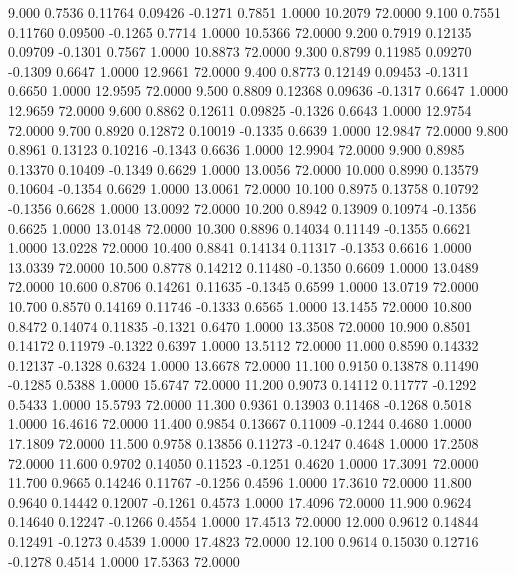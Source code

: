    9.000   0.7536   0.11764   0.09426  -0.1271   0.7851   1.0000  10.2079  72.0000
   9.100   0.7551   0.11760   0.09500  -0.1265   0.7714   1.0000  10.5366  72.0000
   9.200   0.7919   0.12135   0.09709  -0.1301   0.7567   1.0000  10.8873  72.0000
   9.300   0.8799   0.11985   0.09270  -0.1309   0.6647   1.0000  12.9661  72.0000
   9.400   0.8773   0.12149   0.09453  -0.1311   0.6650   1.0000  12.9595  72.0000
   9.500   0.8809   0.12368   0.09636  -0.1317   0.6647   1.0000  12.9659  72.0000
   9.600   0.8862   0.12611   0.09825  -0.1326   0.6643   1.0000  12.9754  72.0000
   9.700   0.8920   0.12872   0.10019  -0.1335   0.6639   1.0000  12.9847  72.0000
   9.800   0.8961   0.13123   0.10216  -0.1343   0.6636   1.0000  12.9904  72.0000
   9.900   0.8985   0.13370   0.10409  -0.1349   0.6629   1.0000  13.0056  72.0000
  10.000   0.8990   0.13579   0.10604  -0.1354   0.6629   1.0000  13.0061  72.0000
  10.100   0.8975   0.13758   0.10792  -0.1356   0.6628   1.0000  13.0092  72.0000
  10.200   0.8942   0.13909   0.10974  -0.1356   0.6625   1.0000  13.0148  72.0000
  10.300   0.8896   0.14034   0.11149  -0.1355   0.6621   1.0000  13.0228  72.0000
  10.400   0.8841   0.14134   0.11317  -0.1353   0.6616   1.0000  13.0339  72.0000
  10.500   0.8778   0.14212   0.11480  -0.1350   0.6609   1.0000  13.0489  72.0000
  10.600   0.8706   0.14261   0.11635  -0.1345   0.6599   1.0000  13.0719  72.0000
  10.700   0.8570   0.14169   0.11746  -0.1333   0.6565   1.0000  13.1455  72.0000
  10.800   0.8472   0.14074   0.11835  -0.1321   0.6470   1.0000  13.3508  72.0000
  10.900   0.8501   0.14172   0.11979  -0.1322   0.6397   1.0000  13.5112  72.0000
  11.000   0.8590   0.14332   0.12137  -0.1328   0.6324   1.0000  13.6678  72.0000
  11.100   0.9150   0.13878   0.11490  -0.1285   0.5388   1.0000  15.6747  72.0000
  11.200   0.9073   0.14112   0.11777  -0.1292   0.5433   1.0000  15.5793  72.0000
  11.300   0.9361   0.13903   0.11468  -0.1268   0.5018   1.0000  16.4616  72.0000
  11.400   0.9854   0.13667   0.11009  -0.1244   0.4680   1.0000  17.1809  72.0000
  11.500   0.9758   0.13856   0.11273  -0.1247   0.4648   1.0000  17.2508  72.0000
  11.600   0.9702   0.14050   0.11523  -0.1251   0.4620   1.0000  17.3091  72.0000
  11.700   0.9665   0.14246   0.11767  -0.1256   0.4596   1.0000  17.3610  72.0000
  11.800   0.9640   0.14442   0.12007  -0.1261   0.4573   1.0000  17.4096  72.0000
  11.900   0.9624   0.14640   0.12247  -0.1266   0.4554   1.0000  17.4513  72.0000
  12.000   0.9612   0.14844   0.12491  -0.1273   0.4539   1.0000  17.4823  72.0000
  12.100   0.9614   0.15030   0.12716  -0.1278   0.4514   1.0000  17.5363  72.0000
